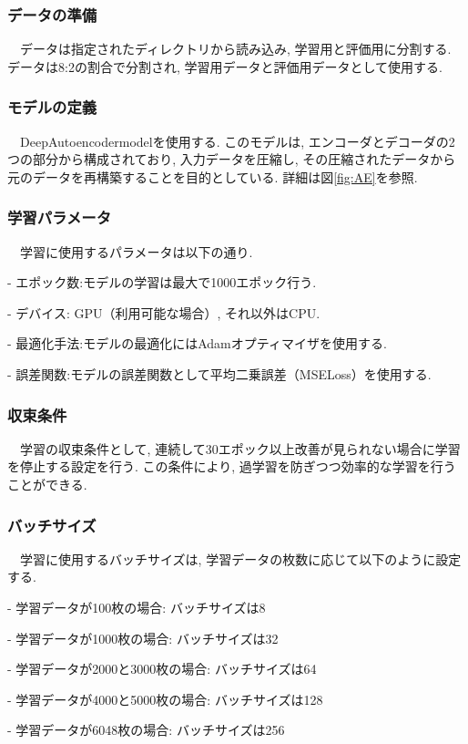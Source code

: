 \documentclass[a4paper, 12pt]{report}
\begin{document}
\subsubsection{データの準備}
　データは指定されたディレクトリから読み込み, 学習用と評価用に分割する. データは8:2の割合で分割され, 学習用データと評価用データとして使用する. 

\subsubsection{モデルの定義}
　DeepAutoencodermodelを使用する. このモデルは, エンコーダとデコーダの2つの部分から構成されており, 入力データを圧縮し, その圧縮されたデータから元のデータを再構築することを目的としている. 詳細は図\ref{fig:AE}を参照. 

\subsubsection{学習パラメータ}
　学習に使用するパラメータは以下の通り. 

- エポック数:モデルの学習は最大で1000エポック行う. 

- デバイス: GPU（利用可能な場合）, それ以外はCPU.

- 最適化手法:モデルの最適化にはAdamオプティマイザを使用する. 

- 誤差関数:モデルの誤差関数として平均二乗誤差（MSELoss）を使用する. 

\subsubsection{収束条件}
　学習の収束条件として, 連続して30エポック以上改善が見られない場合に学習を停止する設定を行う. この条件により, 過学習を防ぎつつ効率的な学習を行うことができる. 

\subsubsection{バッチサイズ}
　学習に使用するバッチサイズは, 学習データの枚数に応じて以下のように設定する. 

- 学習データが100枚の場合: バッチサイズは8

- 学習データが1000枚の場合: バッチサイズは32

- 学習データが2000と3000枚の場合: バッチサイズは64

- 学習データが4000と5000枚の場合: バッチサイズは128

- 学習データが6048枚の場合: バッチサイズは256
\end{document}

